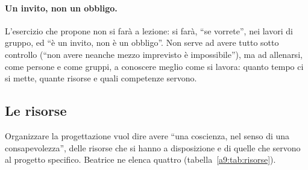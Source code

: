 \paragraph{Un invito, non un obbligo.} L'esercizio che propone non si farà a lezione:
si farà, ``se vorrete'', nei lavori di gruppo, ed ``è un invito, non è un obbligo''.
Non serve ad avere tutto sotto controllo (``non avere neanche mezzo imprevisto è
impossibile''), ma ad allenarsi, come persone e come gruppi, a conoscere meglio come
si lavora: quanto tempo ci si mette, quante risorse e quali competenze servono.

\subsection{Le risorse}
\label{a9:sec:risorse}

Organizzare la progettazione vuol dire avere ``una coscienza, nel senso di una
consapevolezza'', delle risorse che si hanno a disposizione e di quelle che servono al
progetto specifico. Beatrice ne elenca quattro (tabella~\ref{a9:tab:risorse}).

